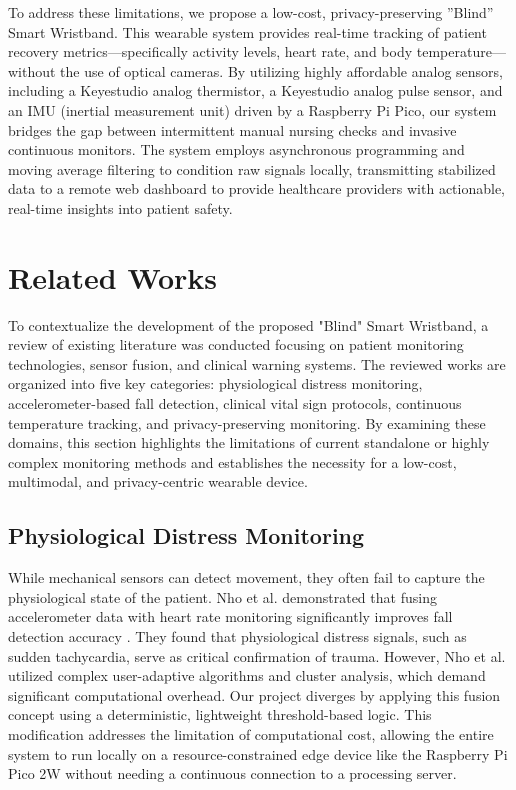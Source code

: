 \documentclass[conference]{IEEEtran}
\begin{document}
To address these limitations, we propose a low-cost, privacy-preserving ''Blind'' Smart Wristband. This wearable system provides real-time tracking of patient recovery metrics---specifically activity levels, heart rate, and body temperature---without the use of optical cameras. By utilizing highly affordable analog sensors, including a Keyestudio analog thermistor, a Keyestudio analog pulse sensor, and an IMU (inertial measurement unit) driven by a Raspberry Pi Pico, our system bridges the gap between intermittent manual nursing checks and invasive continuous monitors. The system employs asynchronous programming and moving average filtering to condition raw signals locally, transmitting stabilized data to a remote web dashboard to provide healthcare providers with actionable, real-time insights into patient safety.

\section{Related Works}

To contextualize the development of the proposed "Blind" Smart Wristband, a review of existing literature was conducted focusing on patient monitoring technologies, sensor fusion, and clinical warning systems. The reviewed works are organized into five key categories: physiological distress monitoring, accelerometer-based fall detection, clinical vital sign protocols, continuous temperature tracking, and privacy-preserving monitoring. By examining these domains, this section highlights the limitations of current standalone or highly complex monitoring methods and establishes the necessity for a low-cost, multimodal, and privacy-centric wearable device.

\subsection{Physiological Distress Monitoring}
While mechanical sensors can detect movement, they often fail to capture the physiological state of the patient. Nho et al. demonstrated that fusing accelerometer data with heart rate monitoring significantly improves fall detection accuracy \cite{nho2020}. They found that physiological distress signals, such as sudden tachycardia, serve as critical confirmation of trauma. However, Nho et al. utilized complex user-adaptive algorithms and cluster analysis, which demand significant computational overhead. Our project diverges by applying this fusion concept using a deterministic, lightweight threshold-based logic. This modification addresses the limitation of computational cost, allowing the entire system to run locally on a resource-constrained edge device like the Raspberry Pi Pico 2W without needing a continuous connection to a processing server.
\end{document}

